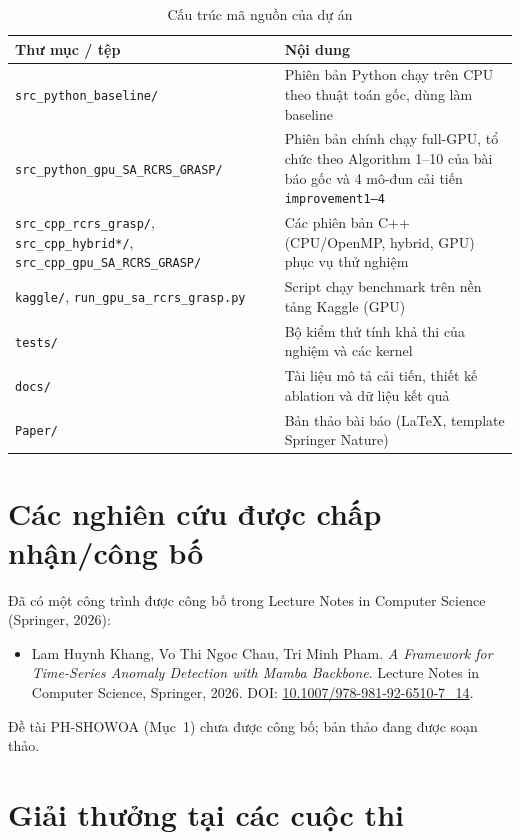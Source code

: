 \documentclass[12pt,a4paper]{article}
\begin{document}
\begin{table}[H]
\centering
\small
\begin{tabularx}{\textwidth}{@{}>{\raggedright\arraybackslash}p{} L@{}}
\toprule
\textbf{Thư mục / tệp} & \textbf{Nội dung} \\
\midrule
\texttt{src\_python\_baseline/} & Phiên bản Python chạy trên CPU theo thuật toán gốc, dùng làm baseline \\
\texttt{src\_python\_gpu\_SA\_RCRS\_GRASP/} & Phiên bản chính chạy full-GPU, tổ chức theo Algorithm 1--10 của bài báo gốc và 4 mô-đun cải tiến \texttt{improvement1–4} \\
\texttt{src\_cpp\_rcrs\_grasp/}, \texttt{src\_cpp\_hybrid*/}, \texttt{src\_cpp\_gpu\_SA\_RCRS\_GRASP/} & Các phiên bản C++ (CPU/OpenMP, hybrid, GPU) phục vụ thử nghiệm \\
\texttt{kaggle/}, \texttt{run\_gpu\_sa\_rcrs\_grasp.py} & Script chạy benchmark trên nền tảng Kaggle (GPU) \\
\texttt{tests/} & Bộ kiểm thử tính khả thi của nghiệm và các kernel \\
\texttt{docs/} & Tài liệu mô tả cải tiến, thiết kế ablation và dữ liệu kết quả \\
\texttt{Paper/} & Bản thảo bài báo (LaTeX, template Springer Nature) \\
\bottomrule
\end{tabularx}
\caption{Cấu trúc mã nguồn của dự án}
\end{table}

\section{Các nghiên cứu được chấp nhận/công bố}

Đã có một công trình được công bố trong Lecture Notes in Computer Science (Springer, 2026):

\begin{itemize}[label={}]
  \item Lam Huynh Khang, Vo Thi Ngoc Chau, Tri Minh Pham. \textit{A Framework for Time-Series Anomaly Detection with Mamba Backbone}. Lecture Notes in Computer Science, Springer, 2026. DOI: \href{https://doi.org/10.1007/978-981-92-6510-7_14}{10.1007/978-981-92-6510-7\_14}.
\end{itemize}

Đề tài PH-SHOWOA (Mục~1) chưa được công bố; bản thảo đang được soạn thảo.

\section{Giải thưởng tại các cuộc thi}
\end{document}
